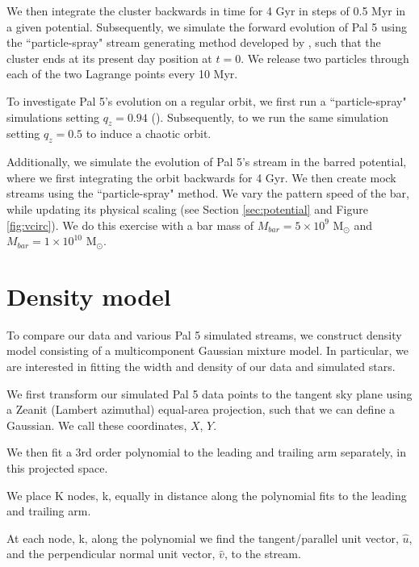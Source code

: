 \documentclass[modern]{aastex62}
\newcommand{\msun}{\textrm{M}_\odot}
\begin{document}

We then integrate the cluster backwards in time for 4 Gyr in steps of 0.5 Myr in a given potential. Subsequently, we simulate the forward evolution of Pal 5 using the ``particle-spray" stream generating method developed by \citet{Fardal:2015}, such that the cluster ends at its present day position at $t = 0$. We release two particles through each of the two Lagrange points every 10 Myr. 

To investigate Pal 5's evolution on a regular orbit, we first run a ``particle-spray" simulations setting $q_z = 0.94$ (\citealt{Bovy:2016}). Subsequently, to we run the same simulation setting $q_z = 0.5$ to induce a chaotic orbit. 

Additionally, we simulate the evolution of Pal 5's stream in the barred potential, where we first integrating the orbit backwards for 4 Gyr. We then create mock streams using the ``particle-spray" method. We vary the pattern speed of the bar, while updating its physical scaling (see Section \ref{sec:potential} and Figure \ref{fig:vcirc}). We do this exercise with a bar mass of $M_{bar} = 5 \times 10^{9}$ $\msun$ and $M_{bar} = 1 \times 10^{10}$ $\msun$.


\section{Density model}
\label{sec:density}
To compare our data and various Pal 5 simulated streams, we construct density model consisting of a multicomponent Gaussian mixture model. In particular, we are interested in fitting the width and density of our data and simulated stars.  

We first transform our simulated Pal 5 data points to the tangent sky plane using a Zeanit (Lambert azimuthal) equal-area projection, such that we can define a Gaussian. We call these coordinates, $X$, $Y$.

We then fit a 3rd order polynomial to the leading and trailing arm separately, in this projected space. 

We place K nodes, k, equally in distance along the polynomial fits to the leading and trailing arm. 

At each node, k, along the polynomial we find the tangent/parallel unit vector,  $\hat{u}$, and the perpendicular normal unit vector, $\hat{v}$, to the stream. 
\end{document}
